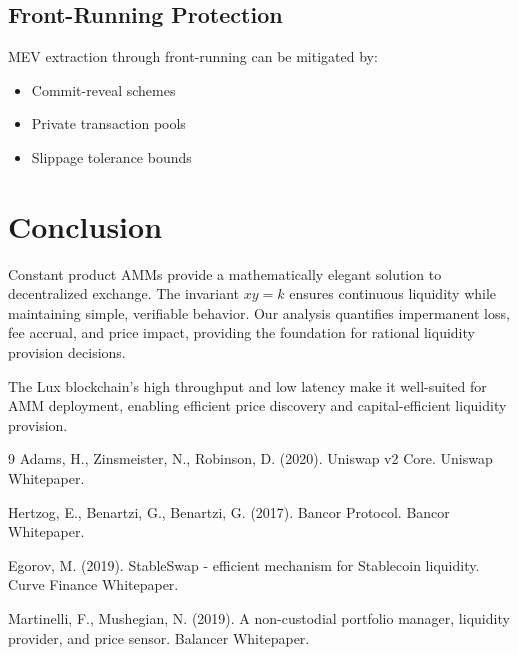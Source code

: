 \documentclass[11pt,a4paper]{article}
\theoremstyle{definition}
\begin{document}
\subsection{Front-Running Protection}

MEV extraction through front-running can be mitigated by:
\begin{itemize}
\item Commit-reveal schemes
\item Private transaction pools
\item Slippage tolerance bounds
\end{itemize}

\section{Conclusion}

Constant product AMMs provide a mathematically elegant solution to decentralized exchange. The invariant $xy = k$ ensures continuous liquidity while maintaining simple, verifiable behavior. Our analysis quantifies impermanent loss, fee accrual, and price impact, providing the foundation for rational liquidity provision decisions.

The Lux blockchain's high throughput and low latency make it well-suited for AMM deployment, enabling efficient price discovery and capital-efficient liquidity provision.

\begin{thebibliography}{9}
Adams, H., Zinsmeister, N., Robinson, D. (2020). Uniswap v2 Core. Uniswap Whitepaper.

Hertzog, E., Benartzi, G., Benartzi, G. (2017). Bancor Protocol. Bancor Whitepaper.

Egorov, M. (2019). StableSwap - efficient mechanism for Stablecoin liquidity. Curve Finance Whitepaper.

Martinelli, F., Mushegian, N. (2019). A non-custodial portfolio manager, liquidity provider, and price sensor. Balancer Whitepaper.
\end{thebibliography}
\end{document}
